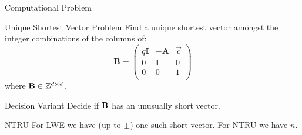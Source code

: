 \documentclass[xcolor=table,10pt,aspectratio=169]{beamer}
\begin{document}
\begin{frame}[label={sec:org560c679}]{Computational Problem}
\begin{block}{Unique Shortest Vector Problem}
Find a unique shortest vector amongst the integer combinations of the columns of:
\[
  \mathbf{B} = \begin{pmatrix}
    q\mathbf{I} & -\mathbf{A} & \vec{c}\\
    0 & \mathbf{I} & 0\\
    0 & 0 & 1\\
  \end{pmatrix}
\]
where \(\mathbf{B} \in \mathbb{Z}^{d \times d}\).
\end{block}

\begin{block}{Decision Variant}
Decide if \(\mathbf{B}\) has an unusually short vector.

\pause
\end{block}

\begin{alertblock}{NTRU}
For LWE we have (up to \(\pm\)) one such short vector. For NTRU we have \(n\).
\end{alertblock}
\end{frame}
\end{document}
